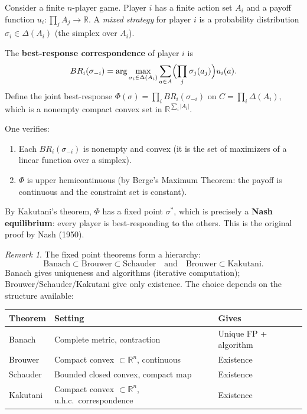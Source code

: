 \documentclass[11pt,a4paper]{article}
\theoremstyle{definition}
\theoremstyle{plain}
\theoremstyle{remark}
\newtheorem{remark}{Remark}[section]
\newcommand{\R}{\mathbb{R}}
\begin{document}
\begin{rlconnection}
Consider a finite $n$-player game. Player $i$ has a finite action set $A_i$
and a payoff function $u_i \colon \prod_j A_j \to \R$. A \emph{mixed strategy}
for player $i$ is a probability distribution $\sigma_i \in \Delta(A_i)$
(the simplex over $A_i$).

The \textbf{best-response correspondence} of player $i$ is
\[
    BR_i(\sigma_{-i}) = \arg\max_{\sigma_i \in \Delta(A_i)}
    \sum_{a \in A} \Bigl(\prod_j \sigma_j(a_j)\Bigr) u_i(a).
\]
Define the joint best-response $\Phi(\sigma) = \prod_i BR_i(\sigma_{-i})$
on $C = \prod_i \Delta(A_i)$, which is a nonempty compact convex set in
$\R^{\sum_i |A_i|}$.

One verifies:
\begin{enumerate}[leftmargin=2em]
    \item Each $BR_i(\sigma_{-i})$ is nonempty and convex (it is the set of
          maximizers of a linear function over a simplex).
    \item $\Phi$ is upper hemicontinuous (by Berge's Maximum Theorem: the
          payoff is continuous and the constraint set is constant).
\end{enumerate}

By Kakutani's theorem, $\Phi$ has a fixed point $\sigma^*$, which is
precisely a \textbf{Nash equilibrium}: every player is best-responding to the
others. This is the original proof by Nash (1950).
\end{rlconnection}

\begin{remark}\label{rem:fixed-point-hierarchy}
The fixed point theorems form a hierarchy:
\[
    \text{Banach} \subset \text{Brouwer} \subset \text{Schauder}
    \quad \text{and} \quad
    \text{Brouwer} \subset \text{Kakutani}.
\]
Banach gives uniqueness and algorithms (iterative computation);
Brouwer/Schauder/Kakutani give only existence. The choice depends on the
structure available:
\begin{center}
\begin{tabular}{lll}
\toprule
\textbf{Theorem} & \textbf{Setting} & \textbf{Gives} \\
\midrule
Banach & Complete metric, contraction & Unique FP + algorithm \\
Brouwer & Compact convex $\subset \R^n$, continuous & Existence \\
Schauder & Bounded closed convex, compact map & Existence \\
Kakutani & Compact convex $\subset \R^n$, u.h.c.\ correspondence & Existence \\
\bottomrule
\end{tabular}
\end{center}
\end{remark}
\end{document}
